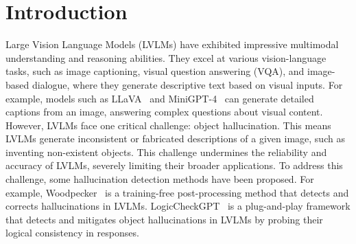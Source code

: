 

\section{Introduction}


Large Vision Language Models (LVLMs) \cite{liu2023llava, ye2023mplug, zhu2023minigpt, li2023otter, bai2023qwen,dai2023instructblip} have exhibited impressive multimodal understanding and reasoning abilities.
They excel at various vision-language tasks, such as image captioning, visual question answering (VQA), and image-based dialogue, where they generate descriptive text based on visual inputs.
For example, models such as LLaVA~\cite{liu2023llava} and MiniGPT-4~\cite{zhu2023minigpt} can generate detailed captions from an image, answering complex questions about visual content.
However, LVLMs face one critical challenge: object hallucination.
This means LVLMs generate inconsistent or fabricated descriptions of a given image, such as inventing non-existent objects.
This challenge undermines the reliability and accuracy of LVLMs, severely limiting their broader applications.
To address this challenge, some hallucination detection methods have been proposed.
For example, Woodpecker~\cite{yin2023woodpecker}  is a training-free post-processing method that detects and corrects hallucinations in LVLMs.
LogicCheckGPT~\cite{wu2024logical} is a plug-and-play framework that detects and mitigates object hallucinations in LVLMs by probing their logical consistency in responses.

